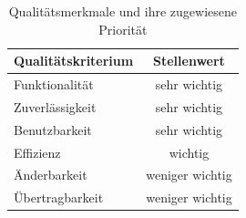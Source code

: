 \documentclass[a4paper]{scrreprt}
\begin{document}
	\begin{table}[h]
 
	    \begin{center}
		    \begin{tabular}{|l|c|}
			    \hline 
			    \rule[-1ex]{0pt}{2.5ex} \textbf{Qualitätskriterium} & \textbf{Stellenwert} \\ 
			    \hline 
			    \rule[-1ex]{0pt}{2.5ex} Funktionalität & sehr wichtig \\ 
			    \hline 
			    \rule[-1ex]{0pt}{2.5ex} Zuverlässigkeit & sehr wichtig \\ 
			    \hline 
			    \rule[-1ex]{0pt}{2.5ex} Benutzbarkeit & sehr wichtig \\ 
			    \hline 
			    \rule[-1ex]{0pt}{2.5ex} Effizienz & wichtig \\ 
			    \hline 
			    \rule[-1ex]{0pt}{2.5ex} Änderbarkeit & weniger wichtig \\ 
			    \hline 
			    \rule[-1ex]{0pt}{2.5ex} Übertragbarkeit & weniger wichtig \\ 
			    \hline   
		    \end{tabular}  
	    \end{center}
	    \caption{Qualitätsmerkmale und ihre zugewiesene Priorität}
	\end{table}
\end{document}
